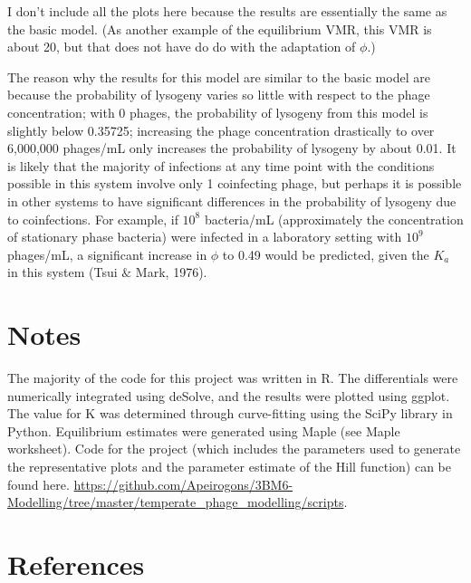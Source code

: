 \documentclass{article}
\begin{document}
I don't include all the plots here because the results are essentially the same as the basic model. (As another example of the equilibrium VMR, this VMR is about 20, but that does not have do do with the adaptation of $\phi$.)

The reason why the results for this model are similar to the basic model are because the probability of lysogeny varies so little with respect to the phage concentration; with 0 phages, the probability of lysogeny from this model is slightly below 0.35725; increasing the phage concentration drastically to over 6,000,000 phages/mL only increases the probability of lysogeny by about 0.01. It is likely that the majority of infections at any time point with the conditions possible in this system involve only 1 coinfecting phage, but perhaps it is possible in other systems to have significant differences in the probability of lysogeny due to coinfections. For example, if $10^8$ bacteria/mL (approximately the concentration of stationary phase bacteria) were infected in a laboratory setting with $10^9$ phages/mL, a significant increase in $\phi$ to 0.49 would be predicted, given the $K_a$ in this system (Tsui $\&$ Mark, 1976). 

\section{Notes}
The majority of the code for this project was written in R. The differentials were numerically integrated using deSolve, and the results were plotted using ggplot. The value for K was determined through curve-fitting using the SciPy library in Python. Equilibrium estimates were generated using Maple (see Maple worksheet). Code for the project (which includes the parameters used to generate the representative plots and the parameter estimate of the Hill function) can be found here. \url{https://github.com/Apeirogons/3BM6-Modelling/tree/master/temperate_phage_modelling/scripts}. 

\section{References}
\end{document}
